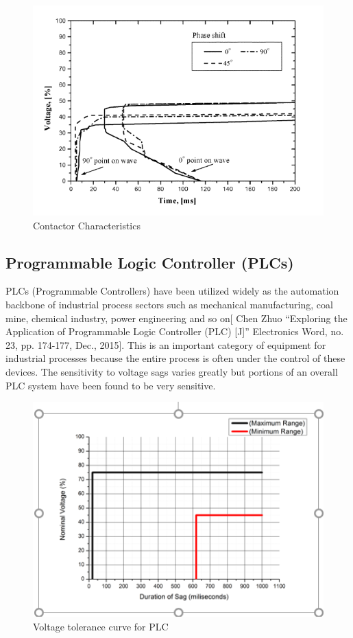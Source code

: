 \documentclass[14pt, a4paper]{extreport}
\begin{document}
 \begin{figure}
     \centering
     \includegraphics[width=\textwidth]{contactor.png}
     \caption{Contactor Characteristics}
     \label{fig:contactor_characteristics}
 \end{figure}
 \subsection{Programmable Logic Controller (PLCs) } PLCs (Programmable Controllers) have been utilized widely as the automation backbone of industrial process sectors such as mechanical manufacturing, coal mine, chemical industry, power engineering and so on[ Chen Zhuo “Exploring the Application of Programmable Logic Controller (PLC) [J]” Electronics Word, no. 23, pp. 174-177, Dec., 2015]. This is an important category of equipment for industrial processes because the entire process is often under the control of these devices. The sensitivity to voltage sags varies greatly but portions of an overall PLC system have been found to be very sensitive. 
 
 \begin{figure}
     \centering
     \includegraphics[width=\textwidth]{plc.PNG}
     \caption{Voltage tolerance curve for PLC}
     \label{fig:my_label}
 \end{figure}
 
\end{document}
